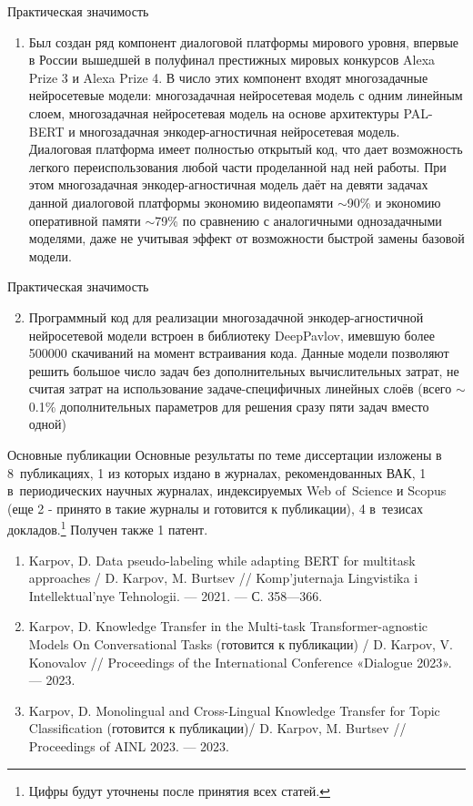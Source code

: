 \begin{frame}{Практическая значимость}
\begin{enumerate}
   \item { Был создан ряд компонент диалоговой платформы мирового уровня, впервые в России вышедшей в полуфинал престижных мировых конкурсов Alexa Prize 3 и Alexa Prize 4. В число этих компонент входят многозадачные нейросетевые модели: многозадачная нейросетевая модель с одним линейным слоем, многозадачная нейросетевая модель на основе архитектуры PAL-BERT и многозадачная энкодер-агностичная нейросетевая модель. Диалоговая платформа имеет полностью открытый код, что дает возможность легкого переиспользования любой части проделанной над ней работы. При этом многозадачная энкодер-агностичная модель даёт на девяти задачах данной диалоговой платформы экономию видеопамяти $\sim$90\% и экономию оперативной памяти $\sim$79\% по сравнению с аналогичными однозадачными моделями, даже не учитывая эффект от возможности быстрой замены базовой модели.}
\end{enumerate}    
\end{frame}
\begin{frame}{Практическая значимость}
\begin{enumerate}
\setcounter{enumi}{1}
   \item {Программный код для реализации многозадачной энкодер-агностичной нейросетевой модели встроен в библиотеку DeepPavlov, имевшую более 500000 скачиваний на момент встраивания кода. Данные модели позволяют решить большое число задач без дополнительных вычислительных затрат, не считая затрат на использование задаче-специфичных линейных слоёв (всего $\sim$0.1\% дополнительных параметров для решения сразу пяти задач вместо одной)}
\end{enumerate}    
\end{frame}

\begin{frame}{Основные публикации}
 Основные результаты по теме диссертации изложены в 8~публикациях, {1} из которых издано в журналах, рекомендованных ВАК, {1} в~периодических научных журналах, индексируемых Web of~Science и Scopus (еще 2 - принято в такие журналы и готовится к публикации), {4} в~тезисах докладов.\footnote{Цифры будут уточнены после принятия всех статей.} Получен также 1 патент.
 \newline
\begin{enumerate}
 \item Karpov, D. Data pseudo-labeling while adapting BERT for multitask
approaches  / D. Karpov, M. Burtsev // Komp’juternaja
Lingvistika i Intellektual’nye Tehnologii. — 2021. — С. 358—366.
\item  Karpov, D. Knowledge Transfer in the Multi-task Transformer-agnostic
Models On Conversational Tasks (готовится к публикации) /
D. Karpov, V. Konovalov // Proceedings of the International Conference
«Dialogue 2023». — 2023.
\item Karpov, D. Monolingual and Cross-Lingual Knowledge Transfer for
Topic Classification (готовится к публикации)/ D. Karpov,
M. Burtsev // Proceedings of AINL 2023. — 2023.
\end{enumerate}
\end{frame}

